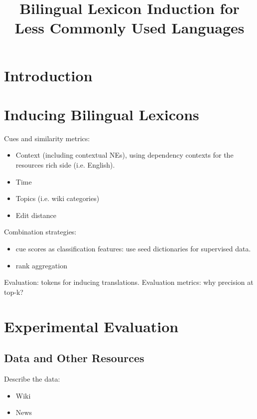 \documentclass[11pt]{article}
\title{Bilingual Lexicon Induction for Less Commonly Used Languages}
\date{}
\begin{document}
\maketitle
\begin{abstract}
\end{abstract}

\section{Introduction} \label{sect:intro}

\section{Inducing Bilingual Lexicons} \label{sect:lexinduct}

Cues and similarity metrics:
\begin{itemize}
\setlength{\parskip}{0pt}
  \item Context (including contextual NEs), using dependency contexts for the resources rich side (i.e. English).
  \item Time
  \item Topics (i.e. wiki categories)
  \item Edit distance
\end{itemize}

\noindent Combination strategies:
\begin{itemize}
\setlength{\parskip}{0pt}
  \item cue scores as classification features: use seed dictionaries for supervised data.
  \item rank aggregation
\end{itemize}

\noindent Evaluation:  tokens for inducing translations.  Evaluation metrics: why precision at top-k?

\section{Experimental Evaluation} \label{sect:exp}

\subsection{Data and Other Resources}

Describe the data:
\begin{itemize}
  \item Wiki
  \item News
\end{itemize}
\end{document}
